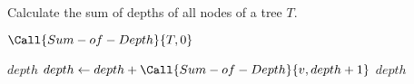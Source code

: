 
\begin{algorithm}[t]
  \caption{Calculate the sum of depths of all nodes of a tree $T$.}
  \label{alg:sum-of-depths}
  \begin{algorithmic}[1]
      \State \Return $\Call{Sum-of-Depth}{T, 0}$ 
    \EndProcedure

    \Statex
     
        \State \Return $depth$
      \Else
	  \State $depth \gets depth + \Call{Sum-of-Depth}{v, depth + 1}$
	\EndFor
	\State \Return $depth$
      \EndIf
    \EndProcedure
  \end{algorithmic}
\end{algorithm}
